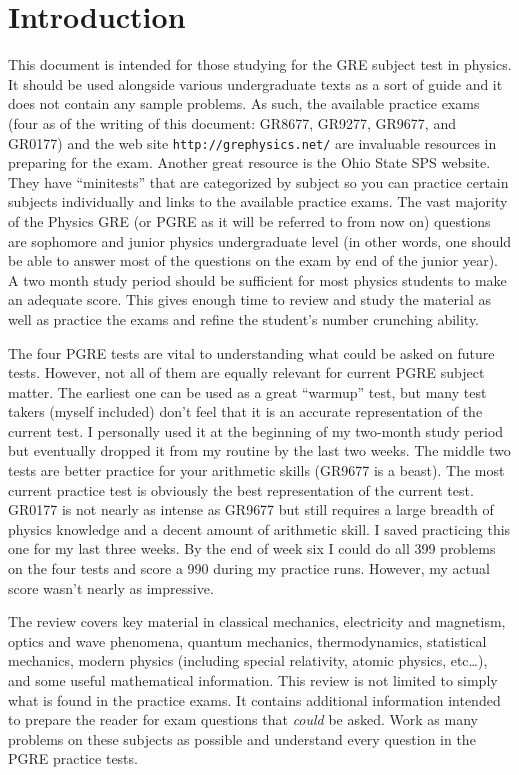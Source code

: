 \section{Introduction}

This document is intended for those studying for the GRE subject test in physics.
It should be used alongside various undergraduate texts as a sort of guide and it does not contain any sample problems.
As such, the available practice exams (four as of the writing of this document: GR8677, GR9277, GR9677, and GR0177) and the web site \texttt{http://grephysics.net/} are invaluable resources in preparing for the exam.
Another great resource is the Ohio State SPS website.
They have ``minitests'' that are categorized by subject so you can practice certain subjects individually and links to the available practice exams.
The vast majority of the Physics GRE (or PGRE as it will be referred to from now on) questions are sophomore and junior physics undergraduate level (in other words, one should be able to answer most of the questions on the exam by end of the junior year).
A two month study period should be sufficient for most physics students to make an adequate score.
This gives enough time to review and study the material as well as practice the exams and refine the student's number crunching ability.

The four PGRE tests are vital to understanding what could be asked on future tests.
However, not all of them are equally relevant for current PGRE subject matter.
The earliest one can be used as a great ``warmup'' test, but many test takers (myself included) don't feel that it is an accurate representation of the current test.
I personally used it at the beginning of my two-month study period but eventually dropped it from my routine by the last two weeks.
The middle two tests are better practice for your arithmetic skills (GR9677 is a beast).
The most current practice test is obviously the best representation of the current test.
GR0177 is not nearly as intense as GR9677 but still requires a large breadth of physics knowledge and a decent amount of arithmetic skill.
I saved practicing this one for my last three weeks.
By the end of week six I could do all 399 problems on the four tests and score a 990 during my practice runs.
However, my actual score wasn't nearly as impressive.

The review covers key material in classical mechanics, electricity and magnetism, optics and wave phenomena, quantum mechanics, thermodynamics, statistical mechanics, modern physics (including special relativity, atomic physics, etc\ldots), and some useful mathematical information.
This review is not limited to simply what is found in the practice exams.
It contains additional information intended to prepare the reader for exam questions that \emph{could} be asked.
Work as many problems on these subjects as possible and understand every question in the PGRE practice tests.

